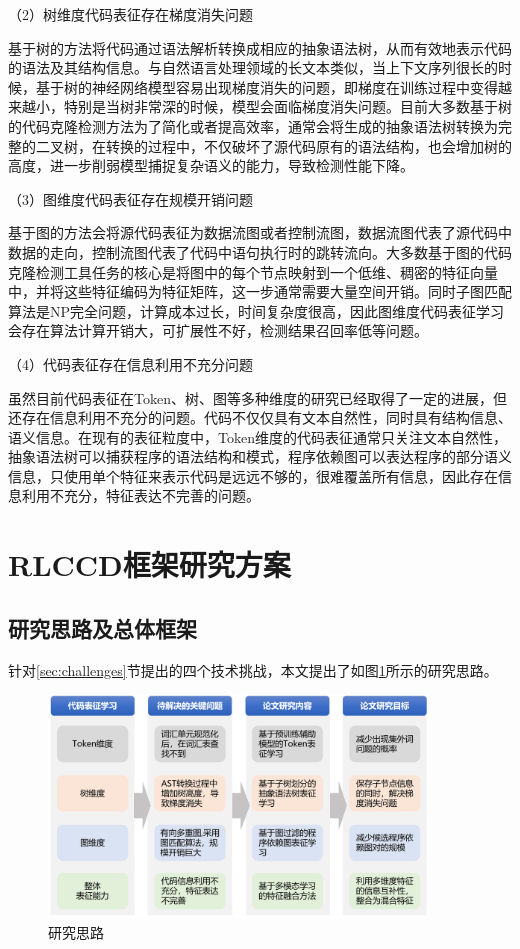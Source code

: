 （2）树维度代码表征存在梯度消失问题

基于树的方法将代码通过语法解析转换成相应的抽象语法树，从而有效地表示代码的语法及其结构信息。与自然语言处理领域的长文本类似，当上下文序列很长的时候，基于树的神经网络模型容易出现梯度消失的问题，即梯度在训练过程中变得越来越小，特别是当树非常深的时候，模型会面临梯度消失问题。目前大多数基于树的代码克隆检测方法为了简化或者提高效率，通常会将生成的抽象语法树转换为完整的二叉树，在转换的过程中，不仅破坏了源代码原有的语法结构，也会增加树的高度，进一步削弱模型捕捉复杂语义的能力，导致检测性能下降。

（3）图维度代码表征存在规模开销问题

基于图的方法会将源代码表征为数据流图或者控制流图，数据流图代表了源代码中数据的走向，控制流图代表了代码中语句执行时的跳转流向。大多数基于图的代码克隆检测工具任务的核心是将图中的每个节点映射到一个低维、稠密的特征向量中，并将这些特征编码为特征矩阵，这一步通常需要大量空间开销。同时子图匹配算法是NP完全问题，计算成本过长，时间复杂度很高，因此图维度代码表征学习会存在算法计算开销大，可扩展性不好，检测结果召回率低等问题。

（4）代码表征存在信息利用不充分问题

虽然目前代码表征在Token、树、图等多种维度的研究已经取得了一定的进展，但还存在信息利用不充分的问题。代码不仅仅具有文本自然性，同时具有结构信息、语义信息。在现有的表征粒度中，Token维度的代码表征通常只关注文本自然性，抽象语法树可以捕获程序的语法结构和模式，程序依赖图可以表达程序的部分语义信息，只使用单个特征来表示代码是远远不够的，很难覆盖所有信息，因此存在信息利用不充分，特征表达不完善的问题。

\section{RLCCD框架研究方案}
\label{sec:Framework}

\subsection{研究思路及总体框架}
\label{subsec:Ideas}
针对\ref{sec:challenges}节提出的四个技术挑战，本文提出了如图\ref{fig:thinking}所示的研究思路。

\begin{figure}[H]
    \centering
    \includegraphics[width=0.9\textwidth]{figures/thinking}
    \caption{研究思路}\label{fig:thinking}
\end{figure}

